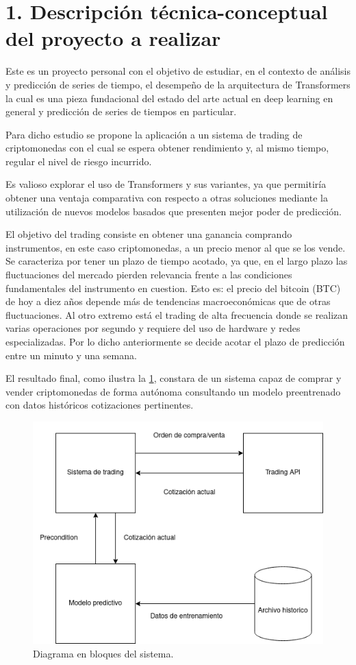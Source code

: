 \documentclass[
    11pt, %
]{charter}
\begin{document}
    \section{1. Descripción técnica-conceptual del proyecto a realizar}
    \label{sec:descripcion}
    Este es un proyecto personal con el objetivo de estudiar, en el contexto de análisis y predicción de series de tiempo,
    el desempeño de la arquitectura de Transformers la cual es una pieza fundacional del estado del arte actual
    en deep learning en general y predicción de series de tiempos en particular.

    Para dicho estudio se propone la aplicación a un sistema de trading de criptomonedas con el cual se espera obtener
    rendimiento y, al mismo tiempo, regular el nivel de riesgo incurrido.

    Es valioso explorar el uso de Transformers y sus variantes, ya que permitiría obtener una ventaja comparativa con
    respecto a otras soluciones mediante la utilización de nuevos modelos basados que presenten mejor poder de predicción.

    El objetivo del trading consiste en obtener una ganancia comprando instrumentos, en este caso criptomonedas, a un precio menor al que se los vende.
    Se caracteriza por tener un plazo de tiempo acotado, ya que, en el largo plazo las fluctuaciones del mercado pierden relevancia
    frente a las condiciones fundamentales del instrumento en cuestion.
    Esto es: el precio del bitcoin (BTC) de hoy a diez años depende más de tendencias macroeconómicas que de otras fluctuaciones.
    Al otro extremo está el trading de alta frecuencia donde se realizan varias operaciones por segundo y requiere del uso de hardware y redes especializadas.
    Por lo dicho anteriormente se decide acotar el plazo de predicción entre un minuto y una semana.

    El resultado final, como ilustra la \ref{fig:diagBloques}, constara de un sistema capaz de comprar y vender criptomonedas de forma autónoma consultando
    un modelo preentrenado con datos históricos cotizaciones pertinentes.

    \begin{figure}[htpb]
            \centering
            \includegraphics[width=.65\textwidth]{./Figuras/bloques-tp-final.drawio.png}
            \caption{Diagrama en bloques del sistema.}
            \label{fig:diagBloques}
        \end{figure}
\end{document}
